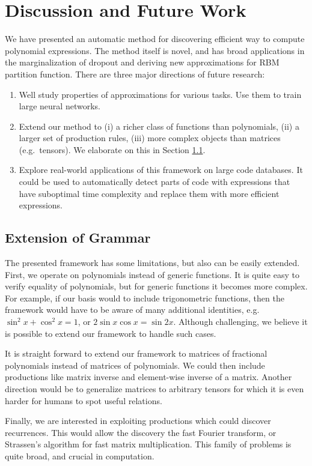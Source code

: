 \section{Discussion and Future Work}

We have presented an automatic method for discovering efficient way to
compute polynomial expressions. The method itself is novel, and
has broad applications in the marginalization of dropout and
deriving new approximations for RBM partition function. There are three
major directions of future research: 

\begin{enumerate}
  \item Well study properties of approximations for various tasks. Use them to
        train large neural networks.
  \item Extend our method to (i) a richer class of functions
    than polynomials, (ii) a larger set of production rules, (iii) more complex
    objects than matrices (e.g.~tensors). We elaborate on this in
    Section \ref{sec:extend}.
\item Explore real-world applications of this framework on large code databases. 
  It could be used to automatically detect parts of code with expressions that have suboptimal 
  time complexity and replace them with more efficient expressions.
\end{enumerate}


\subsection{Extension of Grammar}
\label{sec:extend}
The presented framework has some limitations, but also can be easily extended. First,
we operate on polynomials instead of generic functions. 
It is quite easy to verify equality of polynomials, but for generic functions it becomes more complex.
For example, if our basis would to include trigonometric functions, then the
framework would have to be aware of many additional identities,
e.g. $\sin^2{x} + \cos^2{x} = 1$, or $2\sin x \cos x = \sin
2x$. Although challenging, we believe it is possible to extend our
framework to handle such cases. 

It is straight forward to extend our framework to matrices of fractional
polynomials instead of matrices of polynomials.  We could
then include productions like matrix inverse and element-wise inverse of
a matrix.  Another direction would be to generalize matrices to arbitrary tensors
for which it is even harder for humans to spot useful relations.

Finally, we are interested in exploiting productions which could discover 
recurrences. This would allow the discovery the fast Fourier transform, or
Strassen's algorithm for fast matrix multiplication. This family of problems is quite broad,
and crucial in computation.


